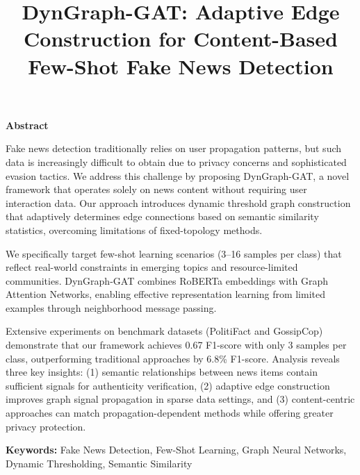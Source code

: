 \documentclass[10pt]{article}
\date{}
\title{\fontsize{16pt}{18pt}\selectfont\bfseries DynGraph-GAT: Adaptive Edge Construction for Content-Based Few-Shot Fake News Detection}
\author{
\makebox[\textwidth]{  %
\begin{minipage}[t]{0.3\textwidth}
\centering
{\fontsize{12pt}{14pt}\selectfont\bfseries
Chen-Yang Yu\\
AI Robotics\\
National Cheng Kung\\
University\\
chenyangyu.cs@gmail.com}
\end{minipage}
\hfill
\begin{minipage}[t]{0.3\textwidth}
\centering
{\fontsize{12pt}{14pt}\selectfont\bfseries
Chih-Yun Lin\\
CSIE\\
National Cheng Kung\\
University\\
chihyunlin@gmail.com}
\end{minipage}
\hfill
\begin{minipage}[t]{0.3\textwidth}
\centering
{\fontsize{12pt}{14pt}\selectfont\bfseries
Cheng-Te Li\\
CSIE\\
National Cheng Kung\\
University\\
chengte@ncku.edu.tw}
\end{minipage}
}
}
\begin{document}
\maketitle

\vspace{1em}

\begin{center}
    {\fontsize{12pt}{14pt}\bfseries Abstract}
\end{center}

{\fontsize{10pt}{12pt}\selectfont
Fake news detection traditionally relies on user propagation patterns, but such data is increasingly difficult to obtain due to privacy concerns and sophisticated evasion tactics. We address this challenge by proposing DynGraph-GAT, a novel framework that operates solely on news content without requiring user interaction data. Our approach introduces dynamic threshold graph construction that adaptively determines edge connections based on semantic similarity statistics, overcoming limitations of fixed-topology methods.

We specifically target few-shot learning scenarios (3–16 samples per class) that reflect real-world constraints in emerging topics and resource-limited communities. DynGraph-GAT combines RoBERTa embeddings with Graph Attention Networks, enabling effective representation learning from limited examples through neighborhood message passing.

Extensive experiments on benchmark datasets (PolitiFact and GossipCop) demonstrate that our framework achieves 0.67 F1-score with only 3 samples per class, outperforming traditional approaches by 6.8\% F1-score. Analysis reveals three key insights: (1) semantic relationships between news items contain sufficient signals for authenticity verification, (2) adaptive edge construction improves graph signal propagation in sparse data settings, and (3) content-centric approaches can match propagation-dependent methods while offering greater privacy protection.
}

\vspace{1em}

{\fontsize{10pt}{12pt}\selectfont
\textbf{Keywords:} Fake News Detection, Few-Shot Learning, Graph Neural Networks, Dynamic Thresholding, Semantic Similarity
}
\end{document}
